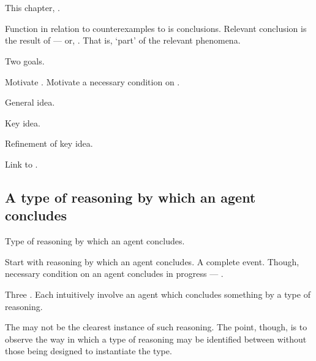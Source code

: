 \chapter{}
\label{cha:typical}
\nocite{Wilson:1994aa}
\nocite{Goodman:1983aa}

\begin{note}
  This chapter, \tC{}.

  Function in relation to counterexamples to \issueConstraint{} is conclusions.
  Relevant conclusion is the result of \tC{} --- or, \tC[reasoning]{}.
  That is, `part' of the relevant phenomena.

  Two goals.

  Motivate \tC{}.
  Motivate a necessary condition on \tC{}.
\end{note}

\begin{note}
  \begin{TOCEnum}
  \item

    General idea.
  \item

    Key idea.
  \item

    Refinement of key idea.
  \item

    Link \tC{} to .
  \end{TOCEnum}
\end{note}

\section{A type of reasoning by which an agent concludes}
\label{cha:typical:sec:g-s}

\begin{note}
  Type of reasoning by which an agent concludes.

  Start with reasoning by which an agent concludes.
  A complete event.
  Though, necessary condition on an agent concludes in progress --- \tC{}.
\end{note}

\begin{note}
  Three .
  Each  intuitively involve an agent which concludes something by a type of reasoning.

  The  may not be the clearest instance of such reasoning.
  The point, though, is to observe the way in which a type of reasoning may be identified between  without those  being designed to instantiate the type.
\end{note}

